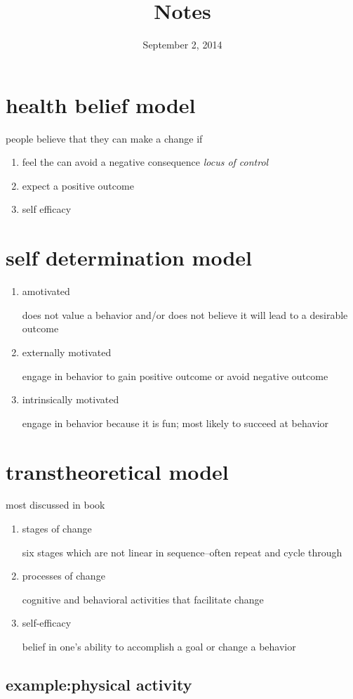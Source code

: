 \documentclass[letterpaper]{article}
\begin{document}
\title{Notes}
\date{September 2, 2014}
\maketitle

\section*{health belief model}
people believe that they can make a change if
\begin{enumerate}
\item
feel the can avoid a negative consequence \emph{locus of control}
\item
expect a positive outcome 
\item
self efficacy
\end{enumerate}
\section*{self determination model}
\begin{enumerate}
\item
amotivated

does not value a behavior and/or does not believe it will lead to a desirable outcome
\item
externally motivated

engage in behavior to gain positive outcome or avoid negative outcome
\item
intrinsically motivated

engage in behavior because it is fun; most likely to succeed at behavior
\end{enumerate}
\section*{transtheoretical model}
most discussed in book
\begin{enumerate}
\item
stages of change

six stages which are not linear in sequence--often repeat and cycle through
\item
processes of change

cognitive and behavioral activities that facilitate change
\item
self-efficacy

belief in one's ability to accomplish a goal or change a behavior
\end{enumerate}

\subsection*{example:physical activity}
\end{document}
